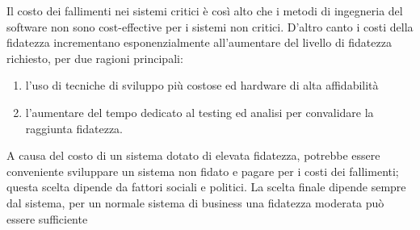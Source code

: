\documentclass[a4paper,12pt, oneside]{book}
\begin{document}
Il costo dei fallimenti nei sistemi critici è così alto che i metodi di ingegneria del software non sono cost-effective per i sistemi non critici. D'altro canto i costi della fidatezza incrementano esponenzialmente all'aumentare del livello di fidatezza richiesto, per due ragioni principali:
\begin{enumerate}
\item l'uso di tecniche di sviluppo più costose ed hardware di alta affidabilità
\item l'aumentare del tempo dedicato al testing ed analisi per convalidare la raggiunta fidatezza.
\end{enumerate}
A causa del costo di un sistema dotato di elevata fidatezza, potrebbe essere conveniente sviluppare un sistema non fidato e pagare per i costi dei fallimenti; questa scelta dipende da fattori sociali e politici. La scelta finale dipende sempre dal sistema, per un normale sistema di business una fidatezza
moderata può essere sufficiente
\end{document}
